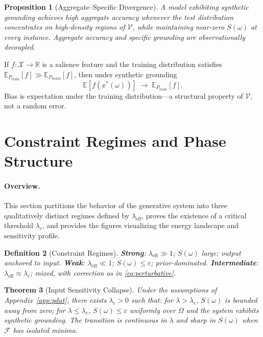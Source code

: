 \documentclass[twocolumn,10pt]{article}
\theoremstyle{thmstyle}
\newtheorem{theorem}{Theorem}[section]
\newtheorem{proposition}[theorem]{Proposition}
\theoremstyle{defstyle}
\newtheorem{definition}[theorem]{Definition}
\newcommand{\Xspace}{\mathcal{X}}
\newcommand{\Fprior}{\mathcal{F}}
\newcommand{\leff}{\lambda_{\mathrm{eff}}}
\newcommand{\Vdomain}{\mathcal{V}}
\begin{document}
\begin{proposition}[Aggregate--Specific Divergence]
\label{prop:asd}
A model exhibiting synthetic grounding achieves high aggregate accuracy
whenever the test distribution concentrates on high-density regions of
$\Vdomain$, while maintaining near-zero $S(\omega)$ at every instance.
Aggregate accuracy and specific grounding are observationally decoupled.
\end{proposition}

If $f:\Xspace\to\mathbb{R}$ is a salience feature and the training
distribution satisfies $\mathbb{E}_{P_{\mathrm{train}}}[f] \gg
\mathbb{E}_{P_{\mathrm{world}}}[f]$, then under synthetic grounding
\[
  \mathbb{E}[f(x^*(\omega))] \;\to\;
  \mathbb{E}_{P_{\mathrm{train}}}[f].
\]
Bias is expectation under the training distribution---a structural
property of $\Vdomain$, not a random error.

\FloatBarrier
\section{Constraint Regimes and Phase Structure}
\label{sec:regimes}

\paragraph{Overview.}
This section partitions the behavior of the generative system into three
qualitatively distinct regimes defined by $\leff$, proves the existence
of a critical threshold $\lambda_c$, and provides the figures visualizing
the energy landscape and sensitivity profile.

\begin{definition}[Constraint Regimes]
\label{def:regimes}
\textbf{Strong}: $\leff \gg 1$; $S(\omega)$ large; output anchored to
input. \textbf{Weak}: $\leff \ll 1$; $S(\omega)\leq\varepsilon$;
prior-dominated. \textbf{Intermediate}: $\leff \approx \lambda_c$;
mixed, with correction as in \eqref{eq:perturbative}.
\end{definition}

\begin{theorem}[Input Sensitivity Collapse]
\label{thm:isc}
Under the assumptions of Appendix~\ref{app:pdat}, there exists
$\lambda_c > 0$ such that: for $\lambda > \lambda_c$, $S(\omega)$ is
bounded away from zero; for $\lambda \leq \lambda_c$, $S(\omega) \leq
\varepsilon$ uniformly over $\Omega$ and the system exhibits synthetic
grounding. The transition is continuous in $\lambda$ and sharp in
$S(\omega)$ when $\Fprior$ has isolated minima.
\end{theorem}
\end{document}
